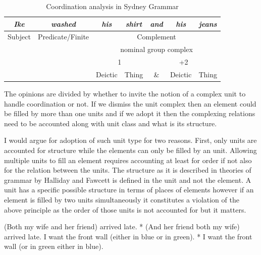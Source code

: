 \begin{table}[h]
	\centering
	\begin{tabular}{|c|c|c|c|c|c|c|}
		\hline
		\textit{Ike}     & \textit{washed}      & \textit{his} & \textit{shirt} & \textit{and} & \textit{his} & \textit{jeans} \\ \hline
		Subject          & Predicate/Finite     & \multicolumn{5}{c|}{Complement}                                              \\ \hline
		\multicolumn{2}{|c|}{\multirow{3}{*}{}} & \multicolumn{5}{c|}{nominal group complex}                                   \\ \cline{3-7} 
		\multicolumn{2}{|c|}{}                  & \multicolumn{2}{c|}{1}        & \multicolumn{3}{c|}{+2}                      \\ \cline{3-7} 
		\multicolumn{2}{|c|}{}                  & Deictic      & Thing          & \&           & Deictic      & Thing          \\ \hline
	\end{tabular}
	\caption{Coordination analysis in Sydney Grammar}
	\label{ex:Sydeny-example-analisys}
\end{table}

The opinions are divided by whether to invite the notion of a complex unit to handle coordination or not. If we dismiss the unit complex then an element could be filled by more than one units and if we adopt it then the complexing relations need to be accounted along with unit class and what is its structure.

I would argue for adoption of such unit type for two reasons. First, only units are accounted for structure while the elements can only be filled by an unit. Allowing multiple units to fill an element requires accounting at least for order if not also for the relation between the units. The structure as it is described in theories of grammar by Halliday \citep{Halliday2002} and Fawcett \citep{Fawcett2000} is defined in the unit and not the element. A unit has a specific possible structure in terms of places of elements however if an element is filled by two units simultaneously it constitutes a violation of the above principle as the order of those units is not accounted for but it matters.
\begin{exe}
	\ex\label{ex:conj2-extra-marker1}
	(Both my wife and her friend) arrived late.  
	\ex\label{ex:conj2-extra-marker11} * (And her friend both my wife) arrived late.
	\ex\label{ex:conj2-extra-marker2}
	I want the front wall (either in blue or in green). 
	\ex\label{ex:conj2-extra-marker21}
	* I want the front wall (or in green either in blue). 
\end{exe}

